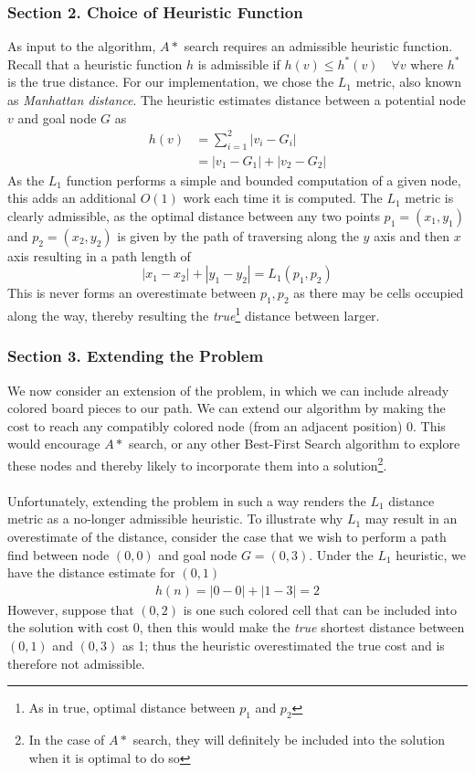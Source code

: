 \documentclass{article}
\begin{document}
\subsubsection*{Section 2. Choice of Heuristic Function}
As input to the algorithm, $A*$ search requires an admissible heuristic function. Recall that a heuristic function $h$ is admissible if $h(v) \leq h^*(v) \quad \forall v$ where $h^*$ is the true distance. For our implementation, we chose the $L_1$ metric, also known as \textit{Manhattan distance}. The heuristic estimates distance between a potential node $v$ and goal node $G$ as 
\begin{align*}
    h(v) &= \sum_{i=1}^2 |v_i - G_i| \\
         &= |v_1 - G_1| + |v_2 - G_2|
\end{align*}
As the $L_1$ function performs a simple and bounded computation of a given node, this adds an additional $O(1)$ work each time it is computed.
The $L_1$ metric is clearly admissible, as the optimal distance between any two points $p_1 = (x_1, y_1)$ and $p_2 = (x_2, y_2)$ is given by the path of traversing along the $y$ axis and then $x$ axis resulting in a path length of
$$|x_1-x_2|+|y_1-y_2| = L_1(p_1, p_2)$$
This is never forms an overestimate between $p_1, p_2$ as there may be cells occupied along the way, thereby resulting the \textit{true}\footnote{As in true, optimal distance between $p_1$ and $p_2$} distance between larger.

\subsubsection*{Section 3. Extending the Problem}
We now consider an extension of the problem, in which we can include already colored board pieces to our path. We can extend our algorithm by making the cost to reach any compatibly colored node (from an adjacent position) 0. This would encourage $A*$ search, or any other Best-First Search algorithm to explore these nodes and thereby likely to incorporate them into a solution\footnote{In the case of $A*$ search, they will definitely be included into the solution when it is optimal to do so}. \\
\\
Unfortunately, extending the problem in such a way renders the $L_1$ distance metric as a no-longer admissible heuristic. To illustrate why $L_1$ may result in an overestimate of the distance, consider the case that we wish to perform a path find between node $(0,0)$ and goal node $G = (0,3)$. Under the $L_1$ heuristic, we have the distance estimate for $(0,1)$
\begin{align*}
    h(n) = |0-0| + |1-3| = 2
\end{align*}
However, suppose that $(0,2)$ is one such colored cell that can be included into the solution with cost 0, then this would make the \textit{true} shortest distance between $(0,1)$ and $(0,3)$ as 1; thus the heuristic overestimated the true cost and is therefore not admissible.
\end{document}
